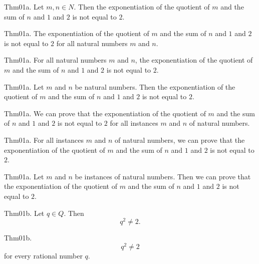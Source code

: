 \documentclass{article}
\begin{document}
Thm01a. Let $m , n \in N$. Then the exponentiation of the quotient of $m$ and the sum of $n$ and $1$ and $2$ is not equal to $2$.

Thm01a. The exponentiation of the quotient of $m$ and the sum of $n$ and $1$ and $2$ is not equal to $2$ for all natural numbers $m$ and $n$.

Thm01a. For all natural numbers $m$ and $n$, the exponentiation of the quotient of $m$ and the sum of $n$ and $1$ and $2$ is not equal to $2$.

Thm01a. Let $m$ and $n$ be natural numbers. Then the exponentiation of the quotient of $m$ and the sum of $n$ and $1$ and $2$ is not equal to $2$.

Thm01a. We can prove that the exponentiation of the quotient of $m$ and the sum of $n$ and $1$ and $2$ is not equal to $2$ for all instances $m$ and $n$ of natural numbers.

Thm01a. For all instances $m$ and $n$ of natural numbers, we can prove that the exponentiation of the quotient of $m$ and the sum of $n$ and $1$ and $2$ is not equal to $2$.

Thm01a. Let $m$ and $n$ be instances of natural numbers. Then we can prove that the exponentiation of the quotient of $m$ and the sum of $n$ and $1$ and $2$ is not equal to $2$.

Thm01b. Let $q \in Q$. Then $$q ^ {2}\neq 2.$$

Thm01b. $$q ^ {2}\neq 2$$ for every rational number $q$.
\end{document}
